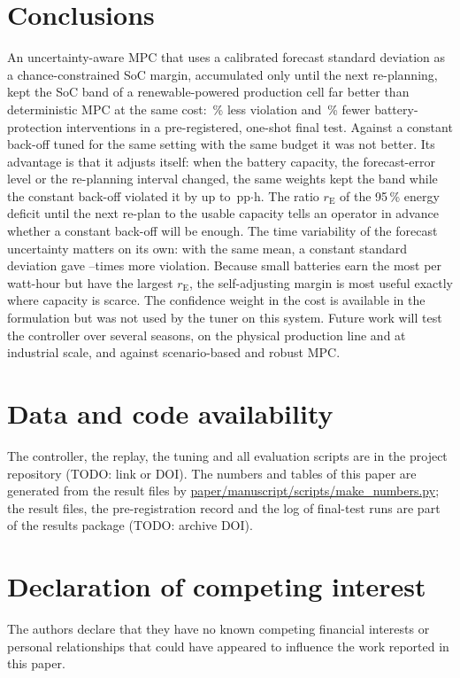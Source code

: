 \documentclass[a4paper,fleqn]{cas-dc}
\newcommand{\pph}{\,pp$\cdot$h\xspace}
\newcommand{\rE}{r_{\mathrm{E}}}
\begin{document}
\section{Conclusions}\label{sec:conclusion}
An uncertainty-aware MPC that uses a calibrated forecast standard deviation as a chance-constrained SoC margin, accumulated only until the next re-planning, kept the SoC band of a renewable-powered production cell far better than deterministic MPC at the same cost: \btDetViolPct\,\% less violation and \btDetProtPct\,\% fewer battery-protection interventions in a pre-registered, one-shot final test. Against a constant back-off tuned for the same setting with the same budget it was not better. Its advantage is that it adjusts itself: when the battery capacity, the forecast-error level or the re-planning interval changed, the same weights kept the band while the constant back-off violated it by up to \mapHighBoMax\pph. The ratio $\rE$ of the 95\,\% energy deficit until the next re-plan to the usable capacity tells an operator in advance whether a constant back-off will be enough. The time variability of the forecast uncertainty matters on its own: with the same mean, a constant standard deviation gave \varConstRatioMin--\varConstRatioMax times more violation. Because small batteries earn the most per watt-hour but have the largest $\rE$, the self-adjusting margin is most useful exactly where capacity is scarce. The confidence weight in the cost is available in the formulation but was not used by the tuner on this system. Future work will test the controller over several seasons, on the physical production line and at industrial scale, and against scenario-based and robust MPC.

\section*{Data and code availability}
The controller, the replay, the tuning and all evaluation scripts are in the project repository (TODO: link or DOI). The numbers and tables of this paper are generated from the result files by \url{paper/manuscript/scripts/make_numbers.py}; the result files, the pre-registration record and the log of final-test runs are part of the results package (TODO: archive DOI).

\section*{Declaration of competing interest}
The authors declare that they have no known competing financial interests or personal relationships that could have appeared to influence the work reported in this paper.
\end{document}
